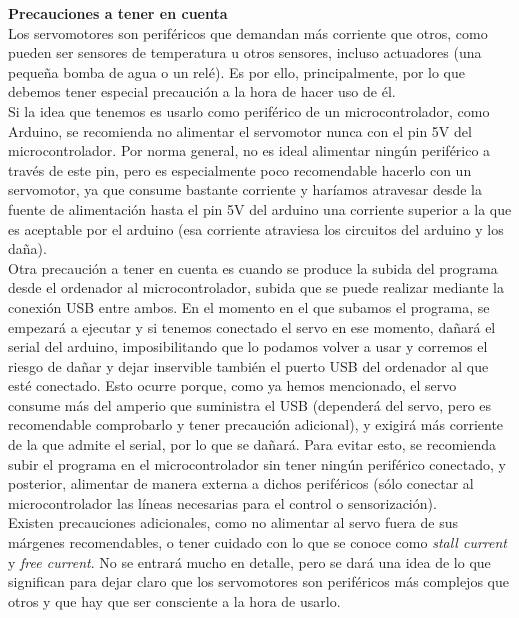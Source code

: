 \documentclass[12pt]{article}
\begin{document}
	\noindent \textbf{Precauciones a tener en cuenta} \\
	
	\noindent Los servomotores son periféricos que demandan más corriente que otros, como pueden ser sensores de temperatura u otros sensores, incluso actuadores (una pequeña bomba de agua o un relé). Es por ello, principalmente, por lo que debemos tener especial precaución a la hora de hacer uso de él. \\
	
	\noindent Si la idea que tenemos es usarlo como periférico de un microcontrolador, como Arduino, se recomienda no alimentar el servomotor nunca con el pin 5V del microcontrolador. Por norma general, no es ideal alimentar ningún periférico a través de este pin, pero es especialmente poco recomendable hacerlo con un servomotor, ya que consume bastante corriente y haríamos atravesar desde la fuente de alimentación hasta el pin 5V del arduino una corriente superior a la que es aceptable por el arduino (esa corriente atraviesa los circuitos del arduino y los daña). \\
	
	\noindent Otra precaución a tener en cuenta es cuando se produce la subida del programa desde el ordenador al microcontrolador, subida que se puede realizar mediante la conexión USB entre ambos. En el momento en el que subamos el programa, se empezará a ejecutar y si tenemos conectado el servo en ese momento, dañará el serial del arduino, imposibilitando que lo podamos volver a usar y corremos el riesgo de dañar y dejar inservible también el puerto USB del ordenador al que esté conectado. Esto ocurre porque, como ya hemos mencionado, el servo consume más del amperio que suministra el USB (dependerá del servo, pero es recomendable comprobarlo y tener precaución adicional), y exigirá más corriente de la que admite el serial, por lo que se dañará. Para evitar esto, se recomienda subir el programa en el microcontrolador sin tener ningún periférico conectado, y posterior, alimentar de manera externa a dichos periféricos (sólo conectar al microcontrolador las líneas necesarias para el control o sensorización). \\
		
	\noindent Existen precauciones adicionales, como no alimentar al servo fuera de sus márgenes recomendables, o tener cuidado con lo que se conoce como \textit{stall current} y \textit{free current}. No se entrará mucho en detalle, pero se dará una idea de lo que significan para dejar claro que los servomotores son periféricos más complejos que otros y que hay que ser consciente a la hora de usarlo.
\end{document}

